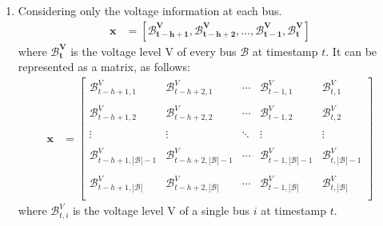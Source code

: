 \begin{enumerate}[label=\textbf{\roman*)}]
    \item \label{onlyV} Considering only the voltage information at each bus.
    \begin{equation}
      \begin{aligned}
        \textbf{x}  &= [\mathbf{\mathcal{B}^{V}_{t-h+1}}, \mathbf{\mathcal{B}^{V}_{t-h+2}}, \dots, \mathbf{\mathcal{B}^{V}_{t-1}}, \mathbf{\mathcal{B}^{V}_{t}}]
      \end{aligned}
    \end{equation}
    \noindent where $\mathbf{\mathcal{B}^{V}_{t}}$ is the voltage level \gls{V} of every bus $\mathcal{B}$ at timestamp $t$. It can be represented as a matrix, as follows:
    \begin{equation*}
      \begin{aligned}
        \textbf{x}  &= 
        \begin{bmatrix}
        \mathcal{B}^{V}_{t-h+1,1} & \mathcal{B}^{V}_{t-h+2,1} & \cdots & \mathcal{B}^{V}_{t-1,1} & \mathcal{B}^{V}_{t,1} \\
        & & & & \\
        
        \mathcal{B}^{V}_{t-h+1,2} & \mathcal{B}^{V}_{t-h+2,2} & \cdots & \mathcal{B}^{V}_{t-1,2} & \mathcal{B}^{V}_{t,2} \\
        & & & & \\
        
        \vdots & \vdots & \ddots & \vdots & \vdots \\
        & & & & \\
        
        \mathcal{B}^{V}_{t-h+1,|\mathcal{B}|-1} & \mathcal{B}^{V}_{t-h+2,|\mathcal{B}|-1} & \cdots & \mathcal{B}^{V}_{t-1,|\mathcal{B}|-1} & \mathcal{B}^{V}_{t,|\mathcal{B}|-1} \\
        & & & & \\
        
        \mathcal{B}^{V}_{t-h+1,|\mathcal{B}|} & \mathcal{B}^{V}_{t-h+2,|\mathcal{B}|} & \cdots & \mathcal{B}^{V}_{t-1,|\mathcal{B}|} & \mathcal{B}^{V}_{t,|\mathcal{B}|} \\
        \end{bmatrix}
      \end{aligned}
    \end{equation*}
    \noindent where $\mathcal{B}^{V}_{t,i}$ is the voltage level \gls{V} of a single bus $i$ at timestamp $t$. \\
    

\end{enumerate}
